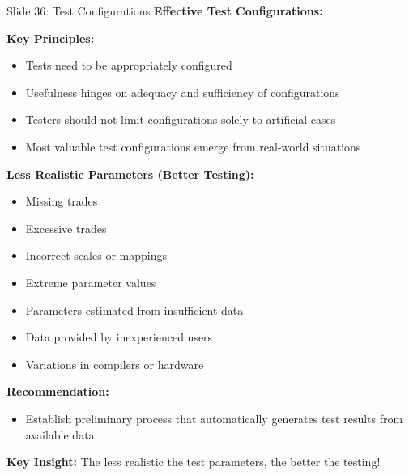 \documentclass[8pt]{beamer}
\begin{document}
	\begin{frame}{Slide 36: Test Configurations}
		\fontsize{6.5}{7.5}\selectfont
		\textbf{Effective Test Configurations:}
		
		\vspace{0.1cm}
		\textbf{Key Principles:}
		\begin{itemize}
			\item Tests need to be appropriately configured
			\item Usefulness hinges on adequacy and sufficiency of configurations
			\item Testers should not limit configurations solely to artificial cases
			\item Most valuable test configurations emerge from real-world situations
		\end{itemize}
		
		\vspace{0.1cm}
		\textbf{Less Realistic Parameters (Better Testing):}
		\begin{itemize}
			\item Missing trades
			\item Excessive trades
			\item Incorrect scales or mappings
			\item Extreme parameter values
			\item Parameters estimated from insufficient data
			\item Data provided by inexperienced users
			\item Variations in compilers or hardware
		\end{itemize}
		
		\vspace{0.1cm}
		\textbf{Recommendation:}
		\begin{itemize}
			\item Establish preliminary process that automatically generates test results from available data
		\end{itemize}
		
		\textcolor{myblue}{\textbf{Key Insight:}} The less realistic the test parameters, \textcolor{myblue}{the better the testing}!
	\end{frame}
	
\end{document}

